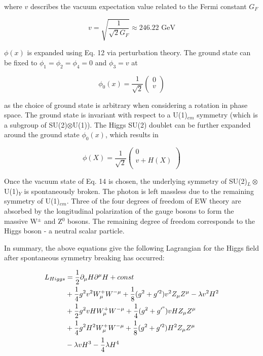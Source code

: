 \documentclass[12pt,a4paper,epsf,portrait,times,epsfig]{report}
\begin{document}
		where $v$ describes the vacuum expectation value related to the Fermi constant $G_{F}$
		
		\begin{equation}
			v = \sqrt{\frac{1}{\sqrt{2}G_{F}}} \approx 246.22 \text{ GeV}
		\end{equation}
		
		$\phi(x)$ is expanded using Eq. 12 via perturbation theory. The ground state can be fixed to $\phi_{1}=\phi_{2}=\phi_{4} = 0$ and $\phi_{3} = v$ at
		
		\begin{equation}
			\phi_{0}(x) = \frac{1}{\sqrt{2}}\begin{pmatrix}
			0 \\
			v \\
			\end{pmatrix}
		\end{equation}
		
		as the choice of ground state is arbitrary when considering a rotation in phase space. The ground state is invariant with respect to a U(1)$_{em}$ symmetry (which is a subgroup of SU(2)$\otimes $U(1)). The Higgs SU(2) doublet can be further expanded around the ground state $\phi_{0}(x)$, which results in 
		
		\begin{equation}
			\phi(X) = \frac{1}{\sqrt{2}}\begin{pmatrix}
			0 \\
			v + H(X) \\
			\end{pmatrix}
		\end{equation}
		
		Once the vacuum state of Eq. 14 is chosen, the underlying symmetry of SU(2)$_{L} \otimes$ U(1)$_{Y}$ is spontaneously broken. The photon is left massless due to the remaining symmetry of U(1)$_{em}$. Three of the four degrees of freedom of EW theory are absorbed by the longitudinal polarization of the gauge bosons to form the massive W$^{\pm}$ and Z$^{0}$ bosons. The remaining degree of freedom corresponds to the Higgs boson - a neutral scalar particle. \par
		In summary, the above equations give the following Lagrangian for the Higgs field after spontaneous symmetry breaking has occurred:
		
		\begin{align}
		\begin{split}
		L_{Higgs} &= \frac{1}{2}\partial_{\mu}H\partial^{\mu}H + const \\
		&+\frac{1}{4}g^{2}v^{2}W_{\mu}^{+}W^{-\mu}+\frac{1}{8}(g^{2}+g'^{2})v^{2}Z_{\mu}Z^{\mu}-\lambda v^{2}H^{2} \\
		&+\frac{1}{2}g^{2}vHW_{\mu}^{+}W^{-\mu} + \frac{1}{4}(g^{2}+g'^{"})vHZ_{\mu}Z^{\mu} \\
		&+\frac{1}{4}g^{2}H^{2}W_{\mu}^{+}W^{-\mu}+\frac{1}{8}(g^{2}+g'^{2})H^{2}Z_{\mu}Z^{\mu} \\
		&-\lambda vH^{3}-\frac{1}{4}\lambda H^{4}
		\end{split}
		\end{align}
		
\end{document}
